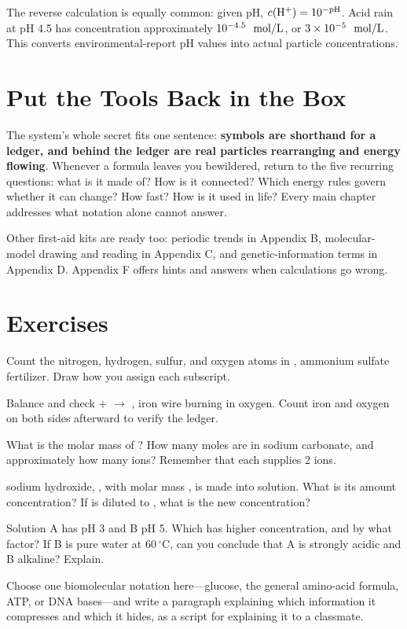 The reverse calculation is equally common: given pH, $c(\mathrm{H^+}) = 10^{-\mathrm{pH}}$. Acid rain at pH 4.5 has  concentration approximately $10^{-4.5}\ \ \mathrm{mol/L}$, or $3\times10^{-5}\ \ \mathrm{mol/L}$. This converts environmental-report pH values into actual particle concentrations.

\section{Put the Tools Back in the Box}

The system's whole secret fits one sentence: \textbf{symbols are shorthand for a ledger, and behind the ledger are real particles rearranging and energy flowing}. Whenever a formula leaves you bewildered, return to the five recurring questions: what is it made of? How is it connected? Which energy rules govern whether it can change? How fast? How is it used in life? Every main chapter addresses what notation alone cannot answer.

Other first-aid kits are ready too: periodic trends in Appendix B, molecular-model drawing and reading in Appendix C, and genetic-information terms in Appendix D. Appendix F offers hints and answers when calculations go wrong.

\section*{Exercises}

\begin{sikaoti}
\item Count the nitrogen, hydrogen, sulfur, and oxygen atoms in , ammonium sulfate fertilizer. Draw how you assign each subscript.
\item Balance and check  +  $\rightarrow$ , iron wire burning in oxygen. Count iron and oxygen on both sides afterward to verify the ledger.
\item What is the molar mass of ? How many moles are in  sodium carbonate, and approximately how many  ions? Remember that each  supplies 2  ions.
\item {} sodium hydroxide, , with molar mass , is made into  solution. What is its amount concentration? If  is diluted to , what is the new concentration?
\item Solution A has pH 3 and B pH 5. Which has higher  concentration, and by what factor? If B is pure water at $60\,^{\circ}\mathrm{C}$, can you conclude that A is strongly acidic and B alkaline? Explain.
\item Choose one biomolecular notation here---glucose, the general amino-acid formula, ATP, or DNA bases---and write a paragraph explaining which information it compresses and which it hides, as a script for explaining it to a classmate.
\end{sikaoti}
